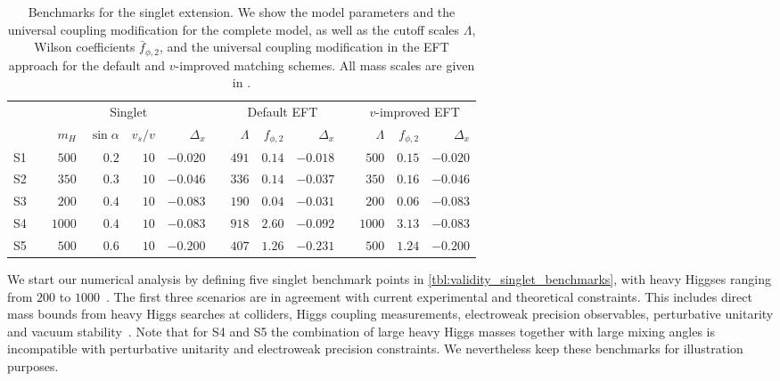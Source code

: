 \begin{table}
  \begin{tabular}{c c rrrr c rrr c rrr}
    \toprule
    \multirow{2}{*}{} && \multicolumn{4}{c}{Singlet} &&
    \multicolumn{3}{c}{Default EFT} && \multicolumn{3}{c}{$v$-improved EFT} \\
    \cmidrule{3-6} \cmidrule{8-10} \cmidrule{12-14}
    && $m_H$ & $\sin\alpha$ & $v_s/v$ & $\Delta_x$ &&
    $\Lambda$ & ${f}_{\phi,2}$ & $\Delta_x$ &&
    $\Lambda$ & ${f}_{\phi,2}$ & $\Delta_x$ \\
    \midrule
    S1 && $500$ & $0.2$ & $10$ & $-0.020$ && $491$ & $0.14$ & $-0.018$ && $500$ & $0.15$ & $-0.020$ \\
    S2 && $350$ & $0.3$ & $10$ & $-0.046$ && $336$ & $0.14$ &  $-0.037$ && $350$ & $0.16$ & $-0.046$ \\
    S3 && $200$ & $0.4$ & $10$ & $-0.083$ && $190$ & $0.04$ & $-0.031$ && $200$ & $0.06$ & $-0.083$ \\
    S4 && $1000$ & $0.4$ & $10$ & $-0.083$ && $918$ & $2.60$ & $-0.092$ && $1000$ & $3.13$ & $-0.083$ \\
    S5 && $500$ &  $0.6$ & $10$ & $-0.200$ && $407$ &$1.26$ & $-0.231$ && $500$ &  $1.24$ & $-0.200$ \\
    \bottomrule
    \end{tabular}
    \caption[Benchmarks for the singlet extension]{Benchmarks for the singlet extension.
      We show the model parameters and the universal coupling modification for the complete
      model, as well as the cutoff scales $\Lambda$, Wilson coefficients $\bar{f}_{\phi,2}$, and the
      universal coupling modification in the EFT approach for the default and $v$-improved
      matching schemes. All mass scales are given in \gev.}
  \label{tbl:validity_singlet_benchmarks}
\end{table}

We start our numerical analysis by defining five singlet benchmark
points in \autoref{tbl:validity_singlet_benchmarks}, with heavy Higgses
ranging from $200$ to $1000$~\gev. The first three scenarios are in
agreement with current experimental and theoretical constraints.  This
includes direct mass bounds from heavy Higgs searches at colliders,
Higgs coupling measurements, electroweak precision observables,
perturbative unitarity and vacuum stability~\cite{Pruna:2013bma,
  Lopez-Val:2014jva, Robens:2015gla}. Note that for S4 and S5 the
combination of large heavy Higgs masses together with large mixing
angles is incompatible with perturbative unitarity and electroweak
precision constraints.  We nevertheless keep these benchmarks for
illustration purposes.



